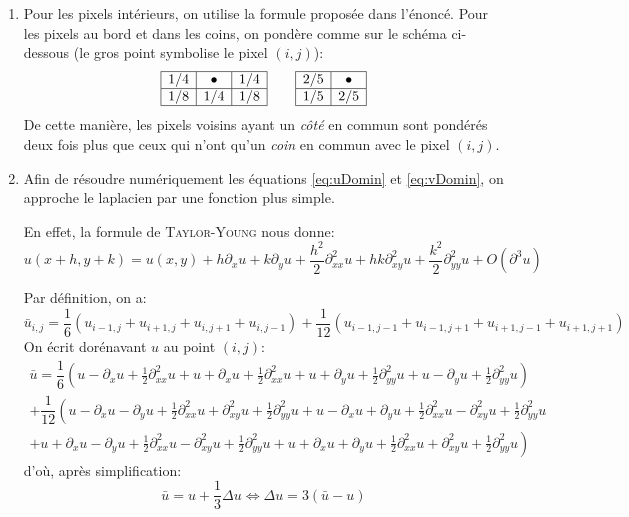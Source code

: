 \begin{enumerate}[questions]
\item Pour les pixels intérieurs, on utilise la formule proposée dans l'énoncé. Pour les pixels au bord et dans les coins, on pondère comme sur le schéma ci-dessous (le gros point symbolise le pixel $(i,j)$):
	\[ 
		\begin{array}{|c|c|c|}
		\hline
		1/4 & \bullet & 1/4 \\
		\hline
		1/8 & 1/4 & 1/8 \\
		\hline
		\end{array} 
		\qquad
		\begin{array}{|c|c|}
		\hline
		2/5 & \bullet \\
		\hline
		1/5 & 2/5 \\
		\hline
		\end{array}
	\]
De cette manière, les pixels voisins ayant un \emph{côté} en commun sont pondérés deux fois plus que ceux qui n'ont qu'un \emph{coin} en commun avec le pixel $(i,j)$.

\item Afin de résoudre numériquement les équations \vref{eq:uDomin} et \vref{eq:vDomin}, on approche le laplacien par une fonction plus simple.

En effet, la formule de \textsc{Taylor-Young} nous donne:
\[ u(x+h, y+k) = u(x,y) + h \partial_xu + k \partial_yu + \dfrac{h^2}{2}\partial^2_{xx}u + hk \partial^2_{xy}u + \dfrac{k^2}{2}\partial^2_{yy}u + O(\partial^3u) \]

Par définition, on a:
\[ \bar{u}_{i,j} = \dfrac{1}{6}\left( u_{i-1,j} + u_{i+1,j} + u_{i,j+1} + u_{i,j-1} \right) + \dfrac{1}{12}\left( u_{i-1,j-1} + u_{i-1,j+1} + u_{i+1,j-1} + u_{i+1,j+1} \right) \]
On écrit dorénavant $u$ au point $(i,j)$:
\begin{multline*}
\bar{u} = \dfrac{1}{6} \left( u - \partial_xu + \frac{1}{2}\partial^2_{xx}u + u + \partial_xu + \frac{1}{2}\partial^2_{xx}u + u + \partial_yu + \frac{1}{2}\partial^2_{yy}u + u - \partial_yu + \frac{1}{2}\partial^2_{yy}u \right) \\
+ \dfrac{1}{12} \left( u - \partial_xu - \partial_yu + \frac{1}{2}\partial^2_{xx}u + \partial^2_{xy}u + \frac{1}{2}\partial^2_{yy}u + u - \partial_xu + \partial_yu + \frac{1}{2}\partial^2_{xx}u - \partial^2_{xy}u + \frac{1}{2}\partial^2_{yy}u \right. \\
\left. + u + \partial_xu - \partial_yu + \frac{1}{2}\partial^2_{xx}u - \partial^2_{xy}u + \frac{1}{2}\partial^2_{yy}u + u + \partial_xu + \partial_yu + \frac{1}{2}\partial^2_{xx}u + \partial^2_{xy}u + \frac{1}{2}\partial^2_{yy}u \right)
\end{multline*}
d'où, après simplification:
\[ \bar{u} = u + \dfrac{1}{3}\Delta u \iff \Delta u = 3(\bar{u} - u) \]


\end{enumerate}
